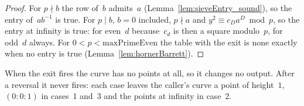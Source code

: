 \begin{proof}
  \leanok
  For $p \nmid b$ the row of~$b$ admits~$a$ (Lemma~\ref{lem:sieveEntry_sound}), so the entry
  of~$a b^{-1}$ is true. For $p \mid b$, $b = 0$ included, $p \nmid a$ and
  $y^2 \equiv c_D a^D \bmod p$, so the entry at infinity is true: for even~$d$ because~$c_d$ is then
  a square modulo~$p$, for odd~$d$ always. For $0 < p < \mathrm{maxPrimeEven}$ the table with the
  exit is none exactly when no entry is true (Lemma~\ref{lem:hornerBarrett}).
\end{proof}

When the exit fires the curve has no points at all, so it changes no output. After a reversal it
never fires: each case leaves the caller's curve a point of height~$1$, $(0 : 0 : 1)$ in cases~1
and~3 and the points at infinity in case~2.
